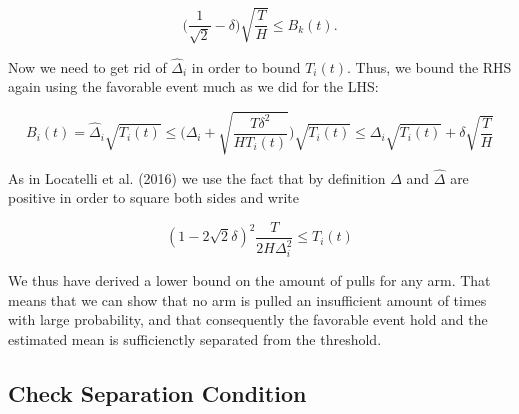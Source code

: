 \documentclass[12pt,]{article}
\begin{document}
\[
\Big( \frac{1}{\sqrt{2}} - \delta \Big) \sqrt{\frac{T}{H}} \leq B_k(t).
\]

Now we need to get rid of \(\hat{\Delta}_i\) in order to bound
\(T_i(t)\). Thus, we bound the RHS again using the favorable event much
as we did for the LHS:

\[
B_i(t) = \hat{\Delta}_i \sqrt{T_i(t)} \leq \Big(\Delta_i + \sqrt{\frac{T\delta^2}{HT_i(t)}}\Big) \sqrt{T_i(t)} \leq \Delta_i \sqrt{T_i(t)} + \delta \sqrt{\frac{T}{H}}
\]

As in Locatelli et al. (2016) we use the fact that by definition
\(\Delta\) and \(\hat{\Delta}\) are positive in order to square both
sides and write

\[
(1 - 2\sqrt{2}\delta)^2 \frac{T}{2H\Delta^2_i} \leq T_i(t)
\]

We thus have derived a lower bound on the amount of pulls for any arm.
That means that we can show that no arm is pulled an insufficient amount
of times with large probability, and that consequently the favorable
event hold and the estimated mean is sufficienctly separated from the
threshold.

\subsection{Check Separation
Condition}\label{check-separation-condition}
\end{document}
